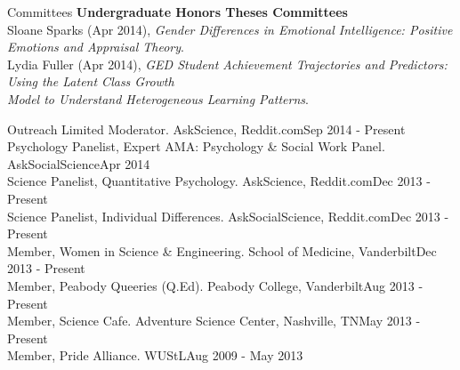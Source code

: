 \documentclass {resume}
\begin{document}
\begin{rSection}{\textrm{Committees}}
{\large \textbf{Undergraduate Honors Theses Committees}}\\
Sloane Sparks (Apr 2014), \textit{Gender Differences in Emotional Intelligence: Positive Emotions and Appraisal Theory}.%
\smallskip\\%
Lydia Fuller (Apr 2014), \textit{GED Student Achievement Trajectories and Predictors: Using the Latent Class Growth\\
\hspace* {6 mm}Model to Understand Heterogeneous Learning Patterns}.%
\end{rSection}%

\begin{rSection}{\textrm{Outreach}}
Limited Moderator. AskScience, Reddit.com\hfill  {Sep 2014 - Present}\smallskip\\
Psychology Panelist, Expert AMA: Psychology \& Social Work Panel. AskSocialScience\hfill  {Apr 2014}\smallskip\\
Science Panelist, Quantitative Psychology. AskScience, Reddit.com\hfill  {Dec 2013 - Present}\smallskip\\%
Science Panelist, Individual Differences. AskSocialScience, Reddit.com\hfill  {Dec 2013 - Present}\smallskip\\
Member, Women in Science \& Engineering. School of Medicine, Vanderbilt\hfill  {Dec 2013 - Present}\smallskip\\%
Member, Peabody Queeries (Q.Ed). Peabody College, Vanderbilt\hfill  {Aug 2013 - Present}\smallskip\\
Member, Science Cafe. Adventure Science Center, Nashville, TN\hfill  {May 2013 - Present}\smallskip\\
Member, Pride Alliance. WUStL\hfill  {Aug 2009 - May 2013}
\end{rSection}
\end{document}
